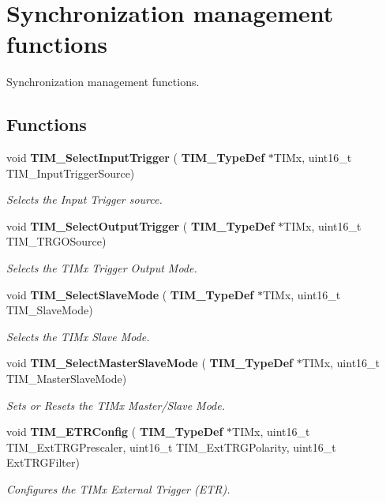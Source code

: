 \section{Synchronization management functions}
\label{group__TIM__Group7}


Synchronization management functions.  


\subsection*{Functions}
\begin{DoxyCompactItemize}
\item 
void \textbf{ T\+I\+M\+\_\+\+Select\+Input\+Trigger} (\textbf{ T\+I\+M\+\_\+\+Type\+Def} $\ast$T\+I\+Mx, uint16\+\_\+t T\+I\+M\+\_\+\+Input\+Trigger\+Source)
\begin{DoxyCompactList}\small\item\em Selects the Input Trigger source. \end{DoxyCompactList}\item 
void \textbf{ T\+I\+M\+\_\+\+Select\+Output\+Trigger} (\textbf{ T\+I\+M\+\_\+\+Type\+Def} $\ast$T\+I\+Mx, uint16\+\_\+t T\+I\+M\+\_\+\+T\+R\+G\+O\+Source)
\begin{DoxyCompactList}\small\item\em Selects the T\+I\+Mx Trigger Output Mode. \end{DoxyCompactList}\item 
void \textbf{ T\+I\+M\+\_\+\+Select\+Slave\+Mode} (\textbf{ T\+I\+M\+\_\+\+Type\+Def} $\ast$T\+I\+Mx, uint16\+\_\+t T\+I\+M\+\_\+\+Slave\+Mode)
\begin{DoxyCompactList}\small\item\em Selects the T\+I\+Mx Slave Mode. \end{DoxyCompactList}\item 
void \textbf{ T\+I\+M\+\_\+\+Select\+Master\+Slave\+Mode} (\textbf{ T\+I\+M\+\_\+\+Type\+Def} $\ast$T\+I\+Mx, uint16\+\_\+t T\+I\+M\+\_\+\+Master\+Slave\+Mode)
\begin{DoxyCompactList}\small\item\em Sets or Resets the T\+I\+Mx Master/\+Slave Mode. \end{DoxyCompactList}\item 
void \textbf{ T\+I\+M\+\_\+\+E\+T\+R\+Config} (\textbf{ T\+I\+M\+\_\+\+Type\+Def} $\ast$T\+I\+Mx, uint16\+\_\+t T\+I\+M\+\_\+\+Ext\+T\+R\+G\+Prescaler, uint16\+\_\+t T\+I\+M\+\_\+\+Ext\+T\+R\+G\+Polarity, uint16\+\_\+t Ext\+T\+R\+G\+Filter)
\begin{DoxyCompactList}\small\item\em Configures the T\+I\+Mx External Trigger (E\+TR). \end{DoxyCompactList}\end{DoxyCompactItemize}


